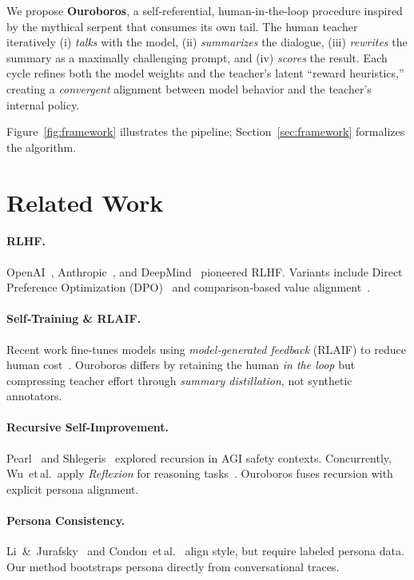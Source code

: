 \documentclass[11pt]{article}
\begin{document}
We propose \textbf{Ouroboros}, a self‑referential, human‑in‑the‑loop procedure inspired by the mythical serpent that consumes its own tail.  The human teacher iteratively (i) \emph{talks} with the model, (ii) \emph{summarizes} the dialogue, (iii) \emph{rewrites} the summary as a maximally challenging prompt, and (iv) \emph{scores} the result.  Each cycle refines both the model weights and the teacher’s latent ``reward heuristics,'' creating a \emph{convergent} alignment between model behavior and the teacher’s internal policy.

Figure~\ref{fig:framework} illustrates the pipeline; Section~\ref{sec:framework} formalizes the algorithm.

\section{Related Work}
\label{sec:related}
\paragraph{RLHF.} OpenAI~\cite{ouyang2022training}, Anthropic~\cite{bai2022constitutional}, and DeepMind~\cite{nakano2022feedme} pioneered RLHF\@. Variants include Direct Preference Optimization (DPO)~\cite{rafailov2023dpo} and comparison‑based value alignment~\cite{stefanovitch2024human}.

\paragraph{Self‑Training \& RLAIF.} Recent work fine‑tunes models using \emph{model‑generated feedback} (RLAIF) to reduce human cost~\cite{huang2023selfrewarding,scheurer2024rlaif}.  Ouroboros differs by retaining the human \emph{in the loop} but compressing teacher effort through \emph{summary distillation}, not synthetic annotators.

\paragraph{Recursive Self‑Improvement.} Pearl~\cite{pearl2023recursive} and Shlegeris~\cite{shlegeris2019ida} explored recursion in AGI safety contexts.  Concurrently, Wu et al.\ apply \emph{Reflexion} for reasoning tasks~\cite{wu2023reflexion}.  Ouroboros fuses recursion with explicit persona alignment.

\paragraph{Persona Consistency.}  Li~\&~Jurafsky~\cite{li2016persona} and Condon et al.~\cite{condon2022cascaded} align style, but require labeled persona data.  Our method bootstraps persona directly from conversational traces.
\end{document}

